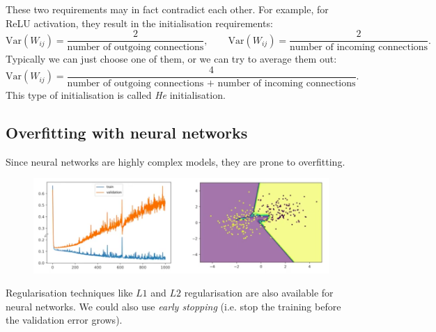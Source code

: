 These two requirements may in fact contradict each other. For example, for ReLU activation, they result in the initialisation requirements:
\begin{equation*}
\textrm{Var}(W_{ij}) = \frac{2}{\text{number of outgoing connections}}, \qquad \textrm{Var}(W_{ij}) = \frac{2}{\text{number of incoming connections}}.
\end{equation*}
Typically we can just choose one of them, or we can try to average them out:
\begin{equation*}
\textrm{Var}(W_{ij}) = \frac{4}{\text{number of outgoing connections } + \text{ number of incoming connections}}.
\end{equation*}
This type of initialisation is called \textit{He} initialisation.\\








\newpage
\subsection{Overfitting with neural networks}
Since neural networks are highly complex models, they are prone to overfitting. 
\begin{figure}[H]
\centering
\includegraphics[scale=0.4]{networkoverfitting.png}
\end{figure}
Regularisation techniques like $L1$ and $L2$ regularisation are also available for neural networks. We could also use \textit{early stopping} (i.e. stop the training before the validation error grows).\\


